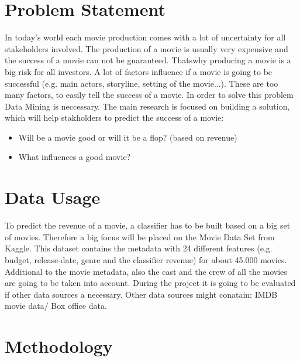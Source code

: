 

 
\section{Problem Statement}
 In today's world each movie production comes with a lot of uncertainty for all stakeholders involved. The production of a movie is usually very expensive and the success of a movie can not be guaranteed. Thatswhy producing a movie is a big risk for all investors. 
A lot of factors influence if a movie is going to be successful (e.g. main actors, storyline, setting of the movie...). These are too many factors, to easily tell the success of a movie. In order to solve this problem Data Mining is neccessary. 
The main research is focused on building a solution, which will help stakholders to predict the success of a movie:

\begin{itemize}
	\item Will be a movie good or will it be a flop?  (based on revenue)
	\item What influences a good movie?
\end{itemize}


\section{Data Usage}
To predict the revenue of a movie, a classifier has to be built based on a big set of movies. Therefore a big focus will be placed on the Movie Data Set from Kaggle. This dataset contains the metadata with 24 different features (e.g. budget, release-date, genre and the classifier revenue) for about 45.000 movies. Additional to the movie metadata, also the cast and the crew of all the movies are going to be taken into account. During the project it is going to be evaluated if other data sources a necessary. Other data sources might conatain: IMDB movie data/ Box office data.



\section{Methodology}

